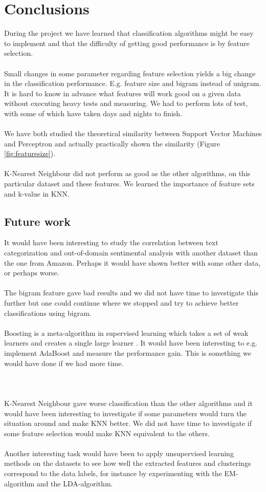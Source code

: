 \chapter{Conclusions}
During the project we have learned that classification algorithms might be easy to implement and that the difficulty of getting good performance is by feature selection. \\\\
Small changes in some parameter regarding feature selection yields a big change in the classification performance. E.g. feature size and bigram instead of unigram. It is hard to know in advance what features will work good on a given data without executing heavy tests and measuring. We had to perform lots of test, with some of which have taken days and nights to finish.
\\\\
We have both studied the theoretical similarity between Support Vector Machines and Perceptron and actually practically shown the similarity (Figure \ref{fig:featuresize}).
\\\\
K-Nearest Neighbour did not perform as good as the other algorithms, on this particular dataset and these features. We learned the importance of feature sets and k-value in KNN.
\section{Future work}
It would have been interesting to study the correlation between text categorization and out-of-domain sentimental analysis with another dataset than the one from Amazon. Perhaps it would have shown better with some other data, or perhaps worse. \\\\
The bigram feature gave bad results and we did not have time to investigate this further but one could continue where we stopped and try to achieve better classifications using bigram. \\\\
Boosting is a meta-algorithm in supervised learning which takes a set of weak learners and creates a single large learner \citep{boosting}. It would have been interesting to e.g. implement AdaBoost and measure the performance gain. This is something we would have done if we had more time. \\\\\\\\
K-Nearest Neighbour gave worse classification than the other algorithms and it would have been interesting to investigate if some parameters would turn the situation around and make KNN better. We did not have time to investigate if some feature selection would make KNN equivalent to the others.
\\\\
Another interesting task would have been to apply unsupervised learning methods on the datasets to see how well the extracted features and clusterings correspond to the data labels, for instance by experimenting with the EM-algorithm and the LDA-algorithm.
